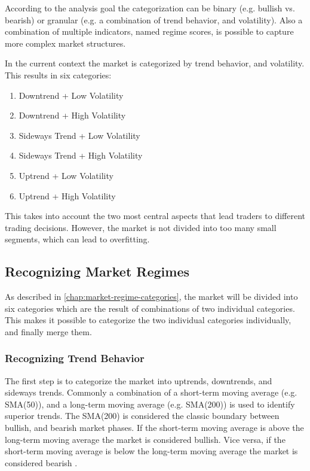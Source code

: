 According to the analysis goal the categorization can be binary (e.g. bullish vs. bearish) or granular (e.g. a combination of trend behavior, and volatility). Also a combination of multiple indicators, named regime scores, is possible to capture more complex market structures.

In the current context the market is categorized by trend behavior, and volatility. This results in six categories:

\begin{enumerate}
    \item Downtrend + Low Volatility
    \item Downtrend + High Volatility
    \item Sideways Trend + Low Volatility
    \item Sideways Trend + High Volatility
    \item Uptrend + Low Volatility
    \item Uptrend + High Volatility
\end{enumerate}

This takes into account the two most central aspects that lead traders to different trading decisions. However, the market is not divided into too many small segments, which can lead to overfitting.

\subsection{Recognizing Market Regimes}

As described in \autoref{chap:market-regime-categories}, the market will be divided into six categories which are the result of combinations of two individual categories. This makes it possible to categorize the two individual categories individually, and finally merge them.

\subsubsection{Recognizing Trend Behavior}
\label{chap:recognizing-trend}

The first step is to categorize the market into uptrends, downtrends, and sideways trends. Commonly a combination of a short-term moving average (e.g. SMA(50)), and a long-term moving average (e.g. SMA(200)) is used to identify superior trends. The SMA(200) is considered the classic boundary between bullish, and bearish market phases. If the short-term moving average is above the long-term moving average the market is considered bullish. Vice versa, if the short-term moving average is below the long-term moving average the market is considered bearish \cite{ig-regimes-mas}.

